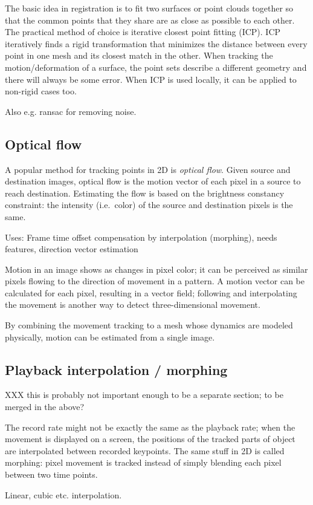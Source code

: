 The basic idea in registration is to fit two surfaces or point clouds together so that the common points that they share are as close as possible to each other.
The practical method of choice is iterative closest point fitting (ICP).
ICP iteratively finds a rigid transformation that minimizes the distance between every point in one mesh and its closest match in the other.
When tracking the motion/deformation of a surface, the point sets describe a different geometry and there will always be some error.
When ICP is used locally, it can be applied to non-rigid cases too. \cite{brown2007global}

Also e.g. ransac for removing noise.

 \cite{zhao2005alignment}


\subsection{Optical flow} %

A popular method for tracking points in 2D is \emph{optical flow}.
Given source and destination images, optical flow is the motion vector of each pixel in a source to reach destination.
Estimating the flow is based on the brightness constancy constraint: the intensity (i.e.\ color) of the source and destination pixels is the same.


Uses: Frame time offset compensation by interpolation (morphing), needs features, direction vector estimation

Motion in an image shows as changes in pixel color; it can be perceived as similar pixels flowing to the direction of movement in a pattern.
A motion vector can be calculated for each pixel, resulting in a vector field; following and interpolating the movement is another way to detect three-dimensional movement.
\cite{gibson1950perception,horn1981determining,beauchemin1995computation}

By combining the movement tracking to a mesh whose dynamics are modeled physically, motion can be estimated from a single image.
\cite{decarlo1996integration}


\subsection{Playback interpolation / morphing} %

XXX this is probably not important enough to be a separate section; to be merged in the above?

The record rate might not be exactly the same as the playback rate; when the movement is displayed on a screen, the positions of the tracked parts of object are interpolated between recorded keypoints.
The same stuff in 2D is called morphing: pixel movement is tracked instead of simply blending each pixel between two time points.

Linear, cubic etc. interpolation.

